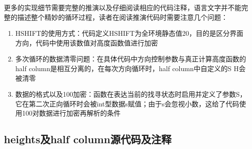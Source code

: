 \documentclass[lang=cn,11pt,a4paper]{elegantpaper}
\begin{document}
更多的实现细节需要完整的推演以及仔细阅读相应的代码注释，语言文字并不能完整的描述整个精妙的循环过程，读者在阅读推演代码时需要注意几个问题：
\begin{enumerate}
    \item HSHIFT的使用方式：代码定义HSHIFT为全环境静态值20，目的是区分界面方向，代码中使用该数值对高度函数值进行加密
    \item 多次循环的数据清零问题：在具体代码中方向控制参数与真正计算高度函数的half column是相互分离的，在每次方向循环时，half column中自定义的S H会被清零
    \item 数据的格式以及100加密：函数在表达当前的找寻状态时启用并定义了参数S，它在第二次正向循环时会被int型数据s赋值；由于s会忽视小数，这给了代码使用100对数据进行加密再解析的条件
\end{enumerate}


\subsection{heights及half column源代码及注释}
\end{document}
